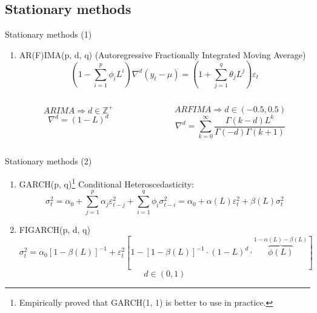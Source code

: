 \documentclass[aspectratio= 169]{beamer}
\begin{document}
		\subsection{Stationary methods}
		\begin{frame}{Stationary methods (1)}
			\begin{enumerate}
				
				\item AR(F)IMA(p, d, q) (Autoregressive Fractionally Integrated Moving Average)
				\begin{equation}
					\left(1 - \sum_{i = 1}^p \phi_iL^i \right)\nabla^{d}(y_t - \mu) = \left(1 + \sum_{j = 1}^q \theta_jL^j\right)\varepsilon_t
				\end{equation}
				\begin{columns}[T]
					\begin{column}{0.48\textwidth}
						$${ARIMA \Rightarrow d \in \mathbb{Z}^+}$$
						$${\nabla^d = \left(1 - L\right)^d}$$
					\end{column}
					\hfill
					\begin{column}{0.48\textwidth}
						$${ARFIMA \Rightarrow d \in (-0.5, 0.5)}$$
						$${\nabla^d = \sum_{k = 0}^\infty \frac{\Gamma{(k - d)}L^k}{\Gamma{(-d)} \Gamma{(k + 1)}}}$$
					\end{column}
				\end{columns}
			\end{enumerate}
		\end{frame}
	
		\begin{frame}{Stationary methods (2)}
			\begin{enumerate}
				\item GARCH(p, q)\footnote{Empirically proved that GARCH(1, 1) is better to use in practice.} Conditional Heteroscedasticity:
				\begin{equation}
					\sigma^2_t = \alpha_0 + \sum_{j = 1}^p \alpha_j \varepsilon^2_{t - j} + \sum_{i = 1}^{q} \phi_i \sigma^2_{t - i} = \alpha_0 + \alpha\left(L\right) \varepsilon_t^2 + \beta\left(L\right) \sigma^2_t
				\end{equation}
			
				\item FIGARCH(p, d, q)
				\begin{equation}
					\sigma_t^2 = \alpha_0\left[1 - \beta\left(L\right)\right]^{-1} + \varepsilon_t^2 \left[1 - \left[1 - \beta\left(L\right)\right]^{-1} \cdot \left(1 - L \right)^d \cdot \overbrace{\phi\left(L\right)}^{1 - \alpha\left(L\right) - \beta\left(L\right)}\right]
				\end{equation}
				$${d \in (0, 1)}$$
			\end{enumerate}
		\end{frame}
	
\end{document}
